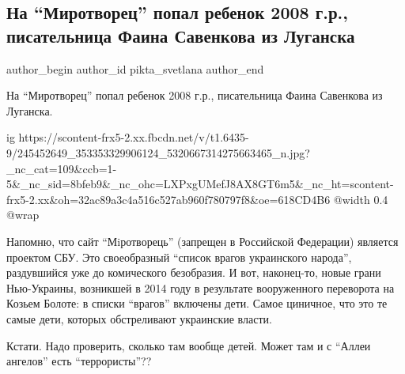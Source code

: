  
 
 
 
 
 
\subsection{На \enquote{Миротворец} попал ребенок 2008 г.р., писательница Фаина Савенкова из Луганска}
\label{sec:13_10_2021.fb.pikta_svetlana.1.mirotvorec_savenkova}
 
\ifcmt
 author_begin
   author_id pikta_svetlana
 author_end
\fi

На \enquote{Миротворец} попал ребенок 2008 г.р., писательница Фаина Савенкова из
Луганска.

\ifcmt
  ig https://scontent-frx5-2.xx.fbcdn.net/v/t1.6435-9/245452649_353353329906124_5320667314275663465_n.jpg?_nc_cat=109&ccb=1-5&_nc_sid=8bfeb9&_nc_ohc=LXPxgUMefJ8AX8GT6m5&_nc_ht=scontent-frx5-2.xx&oh=32ac89a3c4a516c527ab960f780797f8&oe=618CD4B6
  @width 0.4
  @wrap \parpic[r]
\fi

Напомню, что сайт \enquote{Мiротворець} (запрещен в Российской Федерации) является
проектом СБУ. Это своеобразный \enquote{список врагов украинского народа}, раздувшийся
уже до комического безобразия. И вот, наконец-то, новые грани Нью-Украины,
возникшей в 2014 году в результате вооруженного переворота на  Козьем Болоте: в
списки \enquote{врагов} включены дети. Самое циничное, что это те самые дети, которых
обстреливают украинские власти. 

Кстати. Надо проверить, сколько там вообще детей. Может там и с \enquote{Аллеи ангелов}
есть \enquote{террористы}??

